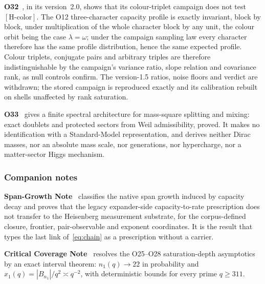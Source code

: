 \documentclass[11pt,a4paper]{article}
\theoremstyle{definition}
\begin{document}
      \textbf{O32}~\cite{Beau2026a36}, in its version~2.0, shows that its colour-triplet campaign
      does not test $[\mathrm{H\text{-}color}]$.
      The O12 three-character capacity profile is exactly invariant, block by block, under
      multiplication of the whole character block by any unit, the colour orbit being the case
      $\lambda = \omega$; under the campaign sampling law every character therefore has the same
      profile distribution, hence the same expected profile.
      Colour triplets, conjugate pairs and arbitrary triples are therefore indistinguishable by the
      campaign's variance ratio, slope relation and covariance rank, as null controls confirm.
      The version-1.5 ratios, noise floors and verdict are withdrawn; the stored campaign is
      reproduced exactly and its calibration rebuilt on shells unaffected by rank saturation.

      \textbf{O33}~\cite{Beau2026a37} gives a finite spectral architecture for mass-square
      splitting and mixing: exact doublets and protected sectors from Weil admissibility, proved.
      It makes no identification with a Standard-Model representation, and derives neither Dirac
      masses, nor an absolute mass scale, nor generations, nor hypercharge, nor a matter-sector
      Higgs mechanism.

      \subsubsection*{Companion notes}

      \textbf{Span-Growth Note}~\cite{Beau2026sgn} classifies the native span growth induced by
      capacity decay and proves that the legacy expander-side capacity-to-rate prescription does not
      transfer to the Heisenberg measurement substrate, for the corpus-defined closure, frontier,
      pair-observable and exponent coordinates.
      It is the result that types the last link of~\eqref{eq:chain} as a prescription without a
      carrier.

      \textbf{Critical Coverage Note}~\cite{Beau2026ccnote} resolves the O25--O28 saturation-depth
      asymptotics by an exact interval theorem: $n_1(q) \to 22$ in probability and
      $x_1(q) = |B_{n_1}|/q^2 \asymp q^{-2}$, with deterministic bounds for every prime
      $q \geq 311$.
\end{document}
